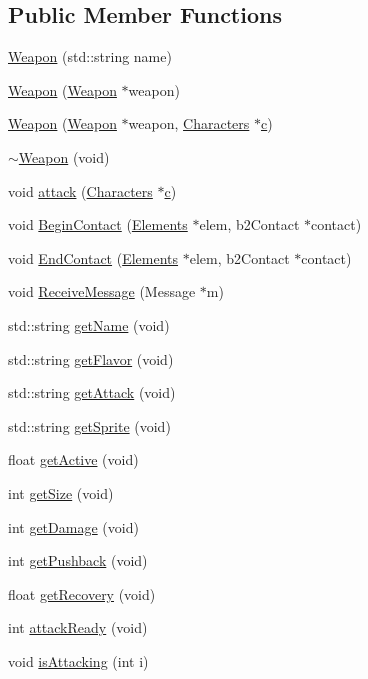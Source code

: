 \subsection*{Public Member Functions}
\begin{DoxyCompactItemize}
\item 
\hyperlink{class_weapon_a7267e890fa563b4f2df8746f443b461a}{Weapon} (std\-::string name)
\item 
\hyperlink{class_weapon_a559c41dbcc415a6ee70112f5231ef83b}{Weapon} (\hyperlink{class_weapon}{Weapon} $\ast$weapon)
\item 
\hyperlink{class_weapon_aa3eb21f28f64908763402004fa802b36}{Weapon} (\hyperlink{class_weapon}{Weapon} $\ast$weapon, \hyperlink{class_characters}{Characters} $\ast$\hyperlink{jquery_8js_abce695e0af988ece0826d9ad59b8160d}{c})
\item 
\hyperlink{class_weapon_aa3364fb5092bbdb4c215e02dd1494f10}{$\sim$\-Weapon} (void)
\item 
void \hyperlink{class_weapon_a90b2b26acbbfc87a14786c8859e4a01d}{attack} (\hyperlink{class_characters}{Characters} $\ast$\hyperlink{jquery_8js_abce695e0af988ece0826d9ad59b8160d}{c})
\item 
void \hyperlink{class_weapon_a866884395ed4c0e7a972bb18e8d7d030}{Begin\-Contact} (\hyperlink{class_elements}{Elements} $\ast$elem, b2\-Contact $\ast$contact)
\item 
void \hyperlink{class_weapon_a1860f840f8c75555de52450300139d9b}{End\-Contact} (\hyperlink{class_elements}{Elements} $\ast$elem, b2\-Contact $\ast$contact)
\item 
void \hyperlink{class_weapon_ad93665811c3df9c05bb22b9a1a9c1a66}{Receive\-Message} (Message $\ast$m)
\item 
std\-::string \hyperlink{class_weapon_aa49263888dca8ee505a95294371adbf6}{get\-Name} (void)
\item 
std\-::string \hyperlink{class_weapon_abe73556e16426da65572d7981dcc800f}{get\-Flavor} (void)
\item 
std\-::string \hyperlink{class_weapon_a693e8f30f48b5df1983c22fdf796f25b}{get\-Attack} (void)
\item 
std\-::string \hyperlink{class_weapon_ace3e431278e9ac23f33d222c67c38497}{get\-Sprite} (void)
\item 
float \hyperlink{class_weapon_aea6024533cc9ca0ce72139ebf5da33f9}{get\-Active} (void)
\item 
int \hyperlink{class_weapon_a47baa57bfa8b9bfeda891d3180caa399}{get\-Size} (void)
\item 
int \hyperlink{class_weapon_a35f92fc79c009c1d1d7d41b4fa17bb11}{get\-Damage} (void)
\item 
int \hyperlink{class_weapon_a60a49fa0a0a76a58698d9b4000815a8b}{get\-Pushback} (void)
\item 
float \hyperlink{class_weapon_a18a362244c6a169db89536505eaa2f15}{get\-Recovery} (void)
\item 
int \hyperlink{class_weapon_aded3e214d38d181504d49719cfc08fa5}{attack\-Ready} (void)
\item 
void \hyperlink{class_weapon_a24f4509a23008f783c566ffa68548fb4}{is\-Attacking} (int i)
\end{DoxyCompactItemize}
